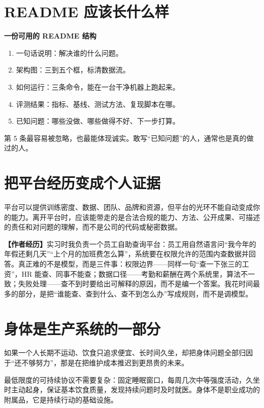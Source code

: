 \documentclass[UTF8,zihao=5,openany]{ctexbook}
\begin{document}
\section{README 应该长什么样}
\begin{toolbox}
\textbf{一份可用的 README 结构}\par\smallskip
\begin{enumerate}
\item 一句话说明：解决谁的什么问题。
\item 架构图：三到五个框，标清数据流。
\item 如何运行：三条命令，能在一台干净机器上跑起来。
\item 评测结果：指标、基线、测试方法、复现脚本在哪。
\item 已知问题：哪些没做、哪些做得不好、下一步打算。
\end{enumerate}
\end{toolbox}

第 5 条最容易被忽略，也最能体现诚实。敢写“已知问题”的人，通常也是真的做过的人。


\section{把平台经历变成个人证据}
平台可以提供训练密度、数据、团队、品牌和资源，但平台的光环不能自动变成你的能力。离开平台时，应该能带走的是合法合规的能力、方法、公开成果、可描述的责任和对问题的理解，而不是公司的代码或秘密数据。

\begin{casebox}
\textbf{【作者经历】}实习时我负责一个员工自助查询平台：员工用自然语言问“我今年的年假还剩几天”“上个月的加班费怎么算”，系统要在权限允许的范围内查数据并回答。真正难的不是模型，而是三件事：权限边界——同样一句“查一下张三的工资”，HR 能查、同事不能查；数据口径——考勤和薪酬在两个系统里，算法不一致；失败处理——查不到时要给出可解释的原因，而不是编一个答案。我花时间最多的部分，是把“谁能查、查到什么、查不到怎么办”写成规则，而不是调模型。
\end{casebox}

\section{身体是生产系统的一部分}
如果一个人长期不运动、饮食只追求便宜、长时间久坐，却把身体问题全部归因于“还不够努力”，那是在把维护成本推迟到更昂贵的未来。

最低限度的可持续协议不需要复杂：固定睡眠窗口，每周几次中等强度活动，久坐时主动起身，保证基本饮食质量，发现持续问题时及时就医。身体不是职业成功的附属品，它是持续行动的基础设施。
\end{document}

